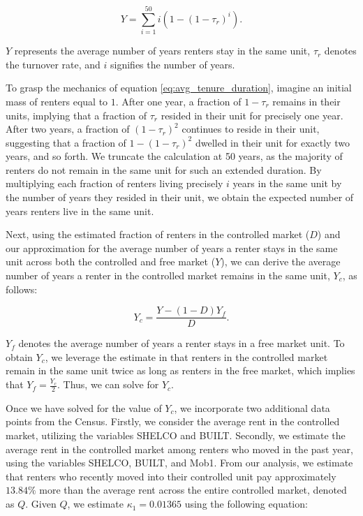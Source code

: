 \documentclass[parskip=full]{article}
\begin{document}
\begin{equation}\label{eq:avg_tenure_duration}
    Y=\sum_{i=1}^{50}i(1-(1-\tau_{r})^{i}).
\end{equation}

\noindent $Y$ represents the average number of years renters stay in the same unit, $\tau_{r}$ denotes the turnover rate, and $i$ signifies the number of years.

To grasp the mechanics of equation \eqref{eq:avg_tenure_duration}, imagine an initial mass of renters equal to $1$. After one year, a fraction of $1-\tau_{r}$ remains in their units, implying that a fraction of $\tau_{r}$ resided in their unit for precisely one year. After two years, a fraction of $(1-\tau_{r})^2$ continues to reside in their unit, suggesting that a fraction of $1-(1-\tau_{r})^2$ dwelled in their unit for exactly two years, and so forth. We truncate the calculation at 50 years, as the majority of renters do not remain in the same unit for such an extended duration. By multiplying each fraction of renters living precisely $i$ years in the same unit by the number of years they resided in their unit, we obtain the expected number of years renters live in the same unit.

Next, using the estimated fraction of renters in the controlled market ($D$) and our approximation for the average number of years a renter stays in the same unit across both the controlled and free market ($Y$), we can derive the average number of years a renter in the controlled market remains in the same unit, $Y_{c}$, as follows:

\begin{equation*}
    Y_{c}=\frac{Y-(1-D)Y_{f}}{D}.
\end{equation*}

\noindent $Y_{f}$ denotes the average number of years a renter stays in a free market unit. To obtain $Y_{c}$, we leverage the estimate in \citet{cjq-2023} that renters in the controlled market remain in the same unit twice as long as renters in the free market, which implies that $Y_{f}=\frac{Y_{c}}{2}$. Thus, we can solve for $Y_{c}$.

Once we have solved for the value of $Y_{c}$, we incorporate two additional data points from the Census. Firstly, we consider the average rent in the controlled market, utilizing the variables SHELCO and BUILT. Secondly, we estimate the average rent in the controlled market among renters who moved in the past year, using the variables SHELCO, BUILT, and Mob1. From our analysis, we estimate that renters who recently moved into their controlled unit pay approximately $13.84\%$ more than the average rent across the entire controlled market, denoted as $Q$. Given $Q$, we estimate $\kappa_{1} = 0.01365$ using the following equation:
\end{document}
